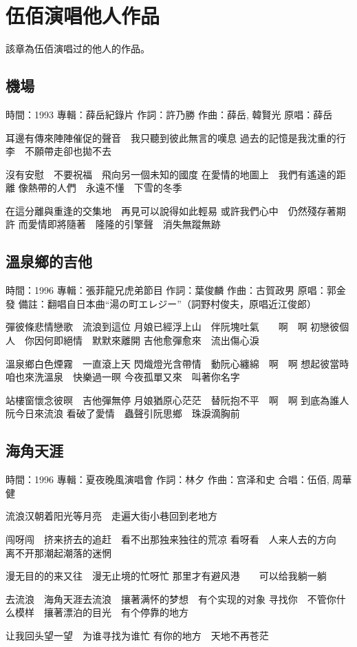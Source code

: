 \documentclass[UTF8,a4paper,oneside,twocolumn,12pt]{ctexbook}
\newcommand{\infopair}[2]{\textbullet #1：#2}
\newcommand{\zc}[1][伍佰]{\infopair{作詞}{#1}}
\newcommand{\zq}[1][伍佰]{\infopair{作曲}{#1}}
\newcommand{\zj}[1]{\infopair{專輯}{#1}}
\newcommand{\yc}[1]{\infopair{原唱}{#1}}
\newcommand{\sj}[1]{\infopair{時間}{#1}}
\newcommand{\bz}[1]{\infopair{備註}{#1}}
\newenvironment{info}{\begin{flushleft}\kaishu
	}
	{\end{flushleft}\normalsize\yahei\par}
\newenvironment{lyric}{
	}
{}
\begin{document}
\chapter{伍佰演唱他人作品}
該章為伍佰演唱过的他人的作品。

\section{機場}
\begin{info}
	\sj{1993}
	\zj{薛岳紀錄片}
	\zc[許乃勝]
	\zq[薛岳, 韓賢光]
	\yc{薛岳}
\end{info}
\begin{lyric}
	耳邊有傳來陣陣催促的聲音　我只聽到彼此無言的嘆息
	過去的記憶是我沈重的行李　不願帶走卻也拋不去

	沒有安慰　不要祝福　飛向另一個未知的國度
	在愛情的地圖上　我們有遙遠的距離
	像熱帶的人們　永遠不懂　下雪的冬季

	在這分離與重逢的交集地　再見可以說得如此輕易
	或許我們心中　仍然殘存著期許
	而愛情即將隨著　隆隆的引擎聲　消失無蹤無跡
\end{lyric}

\section{溫泉鄉的吉他}%
\begin{info}
	\sj{1996}
	\zj{張菲龍兄虎弟節目}
	\zc[葉俊麟]
	\zq[古賀政男]
	\yc{郭金發}
	\bz{翻唱自日本曲“湯の町エレジー”（詞野村俊夫，原唱近江俊郎）}
\end{info}
\begin{lyric}
	彈彼條悲情戀歌　流浪到這位
	月娘已經浮上山　伴阮塊吐氣　　啊　啊
	初戀彼個人　你因何即絕情　默默來離開
	吉他愈彈愈來　流出傷心淚

	溫泉鄉白色煙霧　一直滾上天
	閃熾燈光含帶情　動阮心纏綿　啊　啊
	想起彼當時　咱也來洗溫泉　快樂過一暝
	今夜孤單又來　叫著你名字

	站樓窗懷念彼暝　吉他彈無停
	月娘猶原心茫茫　替阮抱不平　啊　啊
	到底為誰人　阮今日來流浪
	看破了愛情　蟲聲引阮思鄉　珠淚滴胸前
\end{lyric}

\section{海角天涯}
\begin{info}
	\sj{1996}
	\zj{夏夜晚風演唱會}
	\zc[林夕]
	\zq[宫泽和史]
	\infopair{合唱}{伍佰, 周華健}
\end{info}
\begin{lyric}
	流浪汉朝着阳光等月亮　走遍大街小巷回到老地方

	闯呀闯　挤来挤去的追赶　看不出那独来独往的荒凉
	看呀看　人来人去的方向　离不开那潮起潮落的迷惘

	漫无目的的来又往　漫无止境的忙呀忙
	那里才有避风港　　可以给我躺一躺

	去流浪　海角天涯去流浪　攘著满怀的梦想　有个实现的对象
	寻找你　不管你什么模样　攘著漂泊的目光　有个停靠的地方

	让我回头望一望　为谁寻找为谁忙
	有你的地方　天地不再苍茫
\end{lyric}
\end{document}
